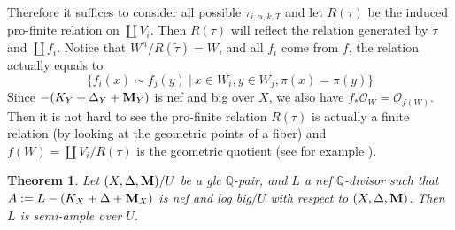 \documentclass[11pt]{amsart}
\numberwithin{equation}{section}
\newcommand{\Mm}{{\bf{M}}}
\newcommand{\Qq}{\mathbb{Q}}
\newcommand{\Oo}{\mathcal{O}}
\newtheorem{thm}{Theorem}[section]
\theoremstyle{definition}
\theoremstyle{definition}
\theoremstyle{definition}
\begin{document}
Therefore it suffices to consider all possible $\tau_{i,\alpha,k,T}$ and let $R(\tau)$ be the induced pro-finite relation on $\coprod V_i$. Then $R(\tau)$ will reflect the relation generated by $\tilde{\tau}$ and $\coprod f_i$. Notice that $W^n/R(\tilde{\tau})=W$, and all $f_i$ come from $f$, the relation actually equals to
$$
\{f_i(x)\sim f_j(y)~|~x\in W_i, y\in W_j, \pi(x)=\pi(y)\}
$$
Since $-(K_Y+\Delta_Y+\Mm_Y)$ is nef and big over $X$, we also have $f_*\Oo_{W}=\Oo_{f(W)}$. Then it is not hard to see the pro-finite relation $R(\tau)$ is actually a finite relation (by looking at the geometric points of a fiber) and $f(W)=\coprod V_i/R(\tau)$ is the geometric quotient (see for example \cite[Propostion 3.12]{HX13}).

\begin{thm}\label{thm: semi-ampleness for glc crepant log structure with log bigness}
Let $(X,\Delta,\Mm)/U$ be a glc $\Qq$-pair, and $L$ a nef $\Qq$-divisor such that $A:=L-(K_X+\Delta+\Mm_X)$ is nef and log big$/U$ with respect to $(X,\Delta,\Mm)$. Then $L$ is semi-ample over $U$. 
\end{thm}
\end{document}
